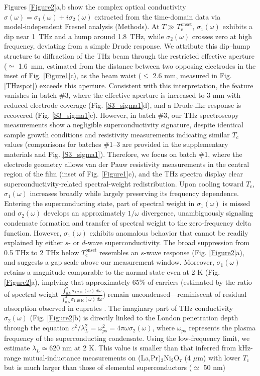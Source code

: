 \documentclass{nature}
\begin{document}
Figures \ref{Figure2}a,b show the complex optical conductivity $\sigma(\omega)=\sigma_1(\omega)+i\sigma_2(\omega)$ extracted from the time‑domain data via model‑independent Fresnel analysis (Methods). At $T \gg T_\mathrm{c}^{\mathrm{onset}}$, $\sigma_1(\omega)$ exhibits a dip near 1 THz and a hump around 1.8 THz, while $\sigma_2(\omega)$ crosses zero at high frequency, deviating from a simple Drude response. We attribute this dip–hump structure to diffraction of the THz beam through the restricted effective aperture ($\simeq$ 1.6 mm, estimated from the distance between two opposing electrodes in the inset of  Fig. \ref{Figure1}c), as the beam waist ($\leq$ 2.6 mm, measured in Fig. \ref{THzspot}) exceeds this aperture. Consistent with this interpretation, the feature vanishes in batch \#3, where the effective aperture is increased to 3 mm with reduced electrode coverage (Fig. \ref{S3_sigma1}d), and a Drude-like response is recovered (Fig. \ref{S3_sigma1}c). However, in batch \#3, our THz spectroscopy measurements show a negligible superconductivity signature, despite identical sample growth conditions and resistivity measurements indicating similar $T_c$ values (comparisons for batches \#1–3 are provided in the supplementary materials and Fig. \ref{S3_sigma1}). Therefore, we focus on batch \#1, where the electrode geometry allows van der Pauw resistivity measurements in the central region of the film (inset of Fig. \ref{Figure1}c), and the THz spectra display clear superconductivity-related spectral-weight redistribution. Upon cooling toward $T_\mathrm{c}$, $\sigma_1(\omega)$ increases broadly while largely preserving its frequency dependence. Entering the superconducting state, part of spectral weight in $\sigma_1(\omega)$ is missed and $\sigma_2(\omega)$ develops an approximately $1/\omega$ divergence, unambiguously signaling condensate formation and transfer of spectral weight to the zero-frequency delta function. However, $\sigma_1(\omega)$ exhibits anomalous behavior that cannot be readily explained by either $s$- or $d$-wave superconductivity. The broad suppression from 0.5 THz to 2 THz below $T_\mathrm{c}^{\mathrm{onset}}$ resembles an $s$-wave response (Fig. \ref{Figure2}a), and suggests a gap scale above our measurement window. Moreover, $\sigma_1(\omega)$ retains a magnitude comparable to the normal state even at 2 K (Fig. \ref{Figure2}a), implying that approximately 65\% of carriers (estimated by the ratio of spectral weight $\frac{\int_{0.5}^{2} \sigma_{\text{1,2 K}}(\omega) \, d\omega}{\int_{0.5}^{2} \sigma_{\text{1,40 K}}(\omega) \, d\omega}$) remain uncondensed—reminiscent of residual absorption observed in cuprates \cite{Bilbro2011}. The imaginary part of THz conductivity $\sigma_2(\omega)$ (Fig. \ref{Figure2}b) is directly linked to the London penetration depth through the equation $c^2/\lambda_L^2 =\omega_{ps}^2=4\pi\omega\sigma_2(\omega)$, where $\omega_{ps}$ represents the plasma frequency of the superconducting condensate. Using the low-frequency limit, we estimate $\lambda_L\simeq 620$ nm at 2 K. This value is smaller than that inferred from kHz-range mutual-inductance measurements on (La,Pr)$_3$Ni$_2$O$_7$ (4 $\mu$m) with lower $T_\text{c}$ \cite{Zhou2025} but is much larger than those of elemental superconductors ($\simeq$ 50 nm) 
\end{document}
